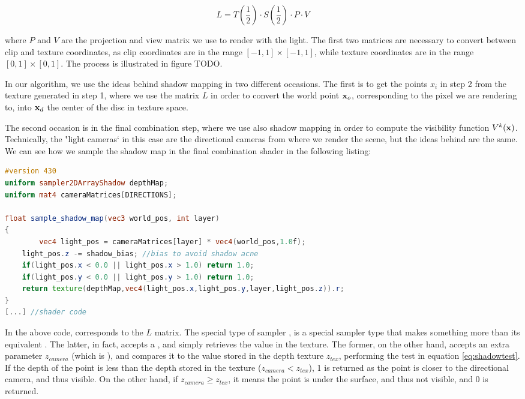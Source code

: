 $$
L = T\left(\frac{1}{2}\right) \cdot S\left(\frac{1}{2}\right) \cdot P \cdot V
$$

where $P$ and $V$ are the projection and view matrix we use to render with the light. The first two matrices are necessary to convert between clip and texture coordinates, as clip coordinates are in the range $[-1,1] \times [-1,1]$, while texture coordinates are in the range $[0,1]\times[0,1]$. The process is illustrated in figure TODO.

In our algorithm, we use the ideas behind shadow mapping in two different occasions. The first is to get the points $x_i$ in step 2 from the texture generated in step 1, where we use the matrix $L$ in order to convert the world point $\mathbf{x}_o$, corresponding to the pixel we are rendering to, into $\mathbf{x}_d$ the center of the disc in texture space. 

The second occasion is in the final combination step, where we use also shadow mapping in order to compute the visibility function $V^k(\mathbf{x})$. Technically, the "light cameras` in this case are the directional cameras from where we render the scene, but the ideas behind are the same. We can see how we sample the shadow map in the final combination shader in the following listing:

\begin{lstlisting}[language=GLSL,label=lst:textureconfshadow,caption={Sampling of the shadow map texture in step 3 of our method.}]
#version 430
uniform sampler2DArrayShadow depthMap;
uniform mat4 cameraMatrices[DIRECTIONS];

float sample_shadow_map(vec3 world_pos, int layer)
{
		vec4 light_pos = cameraMatrices[layer] * vec4(world_pos,1.0f);
    light_pos.z -= shadow_bias; //bias to avoid shadow acne
    if(light_pos.x < 0.0 || light_pos.x > 1.0) return 1.0;
    if(light_pos.y < 0.0 || light_pos.y > 1.0) return 1.0;
    return texture(depthMap,vec4(light_pos.x,light_pos.y,layer,light_pos.z)).r;
}        
[...] //shader code
\end{lstlisting}

In the above code,  corresponds to the $L$ matrix. The special type of sampler , is a special sampler type that makes something more than its equivalent . The latter, in fact, accepts a , and simply retrieves the value in the texture. The former, on the other hand, accepts an extra parameter $z_{camera}$ (which is ), and compares it to the value stored in the depth texture $z_{tex}$, performing the test in equation \ref{eq:shadowtest}. If the depth of the point is less than the depth stored in the texture ($z_{camera} < z_{tex}$), 1 is returned as the point is closer to the directional camera, and thus visible. On the other hand, if $z_{camera} \ge z_{tex}$, it means the point is under the surface, and thus not visible, and 0 is returned.

